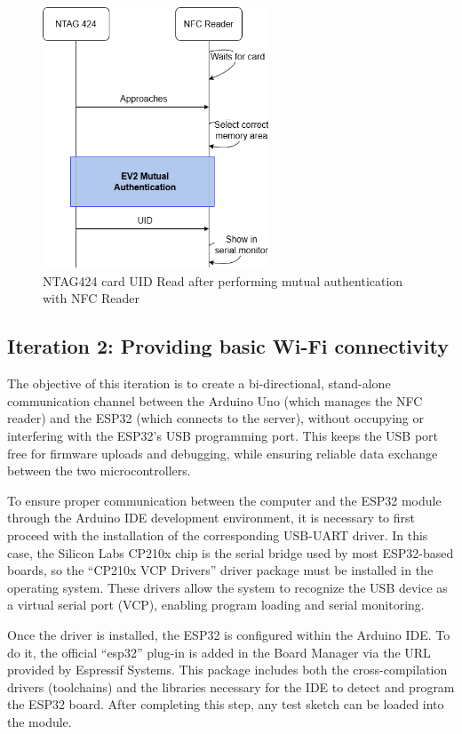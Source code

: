 \begin{figure}[htbp]
	\centering
	\includegraphics[width=0.6\textwidth]{imaxes/UID_READ} %
	\caption{NTAG424 card UID Read after performing mutual authentication with NFC Reader}
	\label{fig:5.8}
\end{figure}

\subsection{Iteration 2: Providing basic Wi-Fi connectivity}

The objective of this iteration is to create a bi-directional, stand-alone communication channel between the Arduino Uno (which manages the NFC reader) and the ESP32 (which connects to the server), without occupying or interfering with the ESP32's USB programming port. This keeps the USB port free for firmware uploads and debugging, while ensuring reliable data exchange between the two microcontrollers.

To ensure proper communication between the computer and the ESP32 module through the Arduino IDE development environment, it is necessary to first proceed with the installation of the corresponding USB-UART driver. In this case, the Silicon Labs CP210x chip is the serial bridge used by most ESP32-based boards, so the “CP210x VCP Drivers” \cite{ref46} driver package must be installed in the operating system. These drivers allow the system to recognize the USB device as a virtual serial port (VCP), enabling program loading and serial monitoring.

Once the driver is installed, the ESP32 is configured within the Arduino IDE. To do it, the official “esp32” plug-in is added in the Board Manager via the URL provided by Espressif Systems. This package includes both the cross-compilation drivers (toolchains) and the libraries necessary for the IDE to detect and program the ESP32 board. After completing this step, any test sketch can be loaded into the module.

